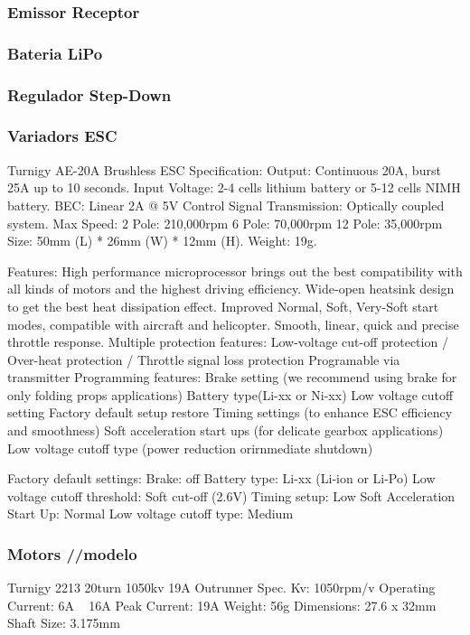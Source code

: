 \documentclass[twoside]{article}
\begin{document}
\subsubsection*{Emissor Receptor}
\subsubsection*{Bateria LiPo}

\subsubsection*{Regulador Step-Down}
\subsubsection*{Variadors ESC}
Turnigy AE-20A Brushless ESC
Specification:
Output:  Continuous 20A, burst 25A up to 10 seconds.
Input Voltage:  2-4 cells lithium battery or 5-12 cells NIMH battery.   
BEC:  Linear 2A @ 5V
Control Signal Transmission: Optically coupled system.
Max Speed:     
   2 Pole: 210,000rpm
   6 Pole: 70,000rpm
   12 Pole: 35,000rpm
Size:  50mm (L) * 26mm (W) * 12mm (H).
Weight:  19g.

Features:
High performance microprocessor brings out the best compatibility with all kinds of motors and the highest driving efficiency.
Wide-open heatsink design to get the best heat dissipation effect.
Improved Normal, Soft, Very-Soft start modes, compatible with aircraft and helicopter. 
Smooth, linear, quick and precise throttle response.
Multiple protection features: Low-voltage cut-off protection / Over-heat protection / Throttle signal loss protection
Programable via transmitter
Programming features:
Brake setting (we recommend using brake for only folding props applications)
Battery type(Li-xx or Ni-xx) 
Low voltage cutoff setting 
Factory default setup restore 
Timing settings (to enhance ESC efficiency and smoothness) 
Soft acceleration start ups (for delicate gearbox applications)
Low voltage cutoff type (power reduction orirnmediate shutdown)
 
Factory default settings:
Brake:  off 
Battery type:  Li-xx (Li-ion or Li-Po) 
Low voltage cutoff threshold:  Soft cut-off (2.6V) 
Timing setup:  Low 
Soft Acceleration Start Up:  Normal  
Low voltage cutoff type:  Medium
\subsubsection*{Motors //modelo}
Turnigy 2213 20turn 1050kv 19A Outrunner
Spec.
Kv: 1050rpm/v
Operating Current: 6A ~ 16A
Peak Current: 19A
Weight: 56g
Dimensions: 27.6 x 32mm
Shaft Size: 3.175mm
\end{document}
